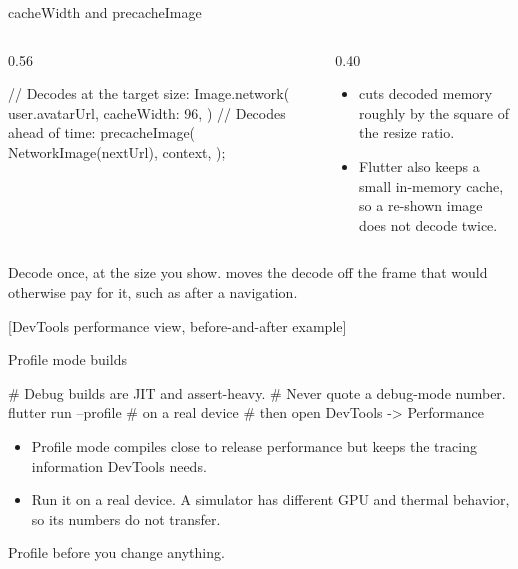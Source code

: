 \documentclass[10pt,aspectratio=169,t]{beamer}
\begin{document}
\begin{frame}[fragile,eyebrow=Optimization]{cacheWidth and precacheImage}
  \begin{columns}[T]
    \begin{column}{0.56\textwidth}
\begin{dart}
// Decodes at the target size:
Image.network(
  user.avatarUrl, cacheWidth: 96,
)
// Decodes ahead of time:
precacheImage(
  NetworkImage(nextUrl), context,
);
\end{dart}
    \end{column}
    \begin{column}{0.40\textwidth}
      \begin{itemize}
        \item {} cuts decoded memory roughly by the square of the resize ratio.
        \item Flutter also keeps a small in-memory cache, so a re-shown image does not decode twice.
      \end{itemize}
    \end{column}
  \end{columns}
  \begin{takeaway}{Decode once, at the size you show.}
     moves the decode off the frame that would otherwise pay for it, such as after a navigation.
  \end{takeaway}
\end{frame}

[DevTools performance view, before-and-after example]

\begin{frame}[fragile,eyebrow=Profiling]{Profile mode builds}
\begin{shell}
# Debug builds are JIT and assert-heavy.
# Never quote a debug-mode number.
flutter run --profile        # on a real device
# then open DevTools -> Performance
\end{shell}
  \begin{itemize}
    \item Profile mode compiles close to release performance but keeps the tracing information DevTools needs.
    \item Run it on a real device. A simulator has different GPU and thermal behavior, so its numbers do not transfer.
  \end{itemize}
  \begin{takeaway}{Profile before you change anything.}
  \end{takeaway}
\end{frame}
\end{document}
